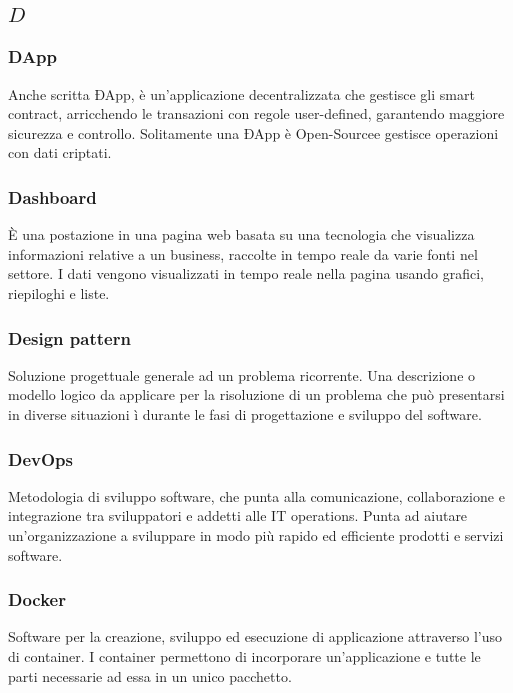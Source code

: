 \subsection*{\quad$D\quad$}
\subsubsection*{DApp}
Anche scritta ÐApp, è un'applicazione decentralizzata che gestisce gli smart contract\glo, arricchendo le transazioni con regole user-defined, garantendo maggiore sicurezza e controllo. Solitamente una ÐApp è Open-Source\glosp e gestisce operazioni con dati criptati.

\subsubsection*{Dashboard}
È una postazione in una pagina web basata su una tecnologia che visualizza informazioni relative a un business, raccolte in tempo reale da varie fonti nel settore. I dati vengono visualizzati in tempo reale nella pagina usando grafici, riepiloghi e liste.

\subsubsection*{Design pattern}
Soluzione progettuale generale ad un problema ricorrente. Una descrizione o modello logico da applicare per la risoluzione di un problema che può presentarsi in diverse situazioni ì durante le fasi di progettazione e sviluppo del software.

\subsubsection*{DevOps}
Metodologia di sviluppo software, che punta alla comunicazione, collaborazione e integrazione tra sviluppatori e addetti alle IT operations. Punta ad aiutare un'organizzazione a sviluppare in modo più rapido ed efficiente prodotti e servizi software.

\subsubsection*{Docker}
Software per la creazione, sviluppo ed esecuzione di applicazione attraverso l’uso di container. I container
permettono di incorporare un’applicazione e tutte le parti necessarie ad essa in un unico pacchetto.

